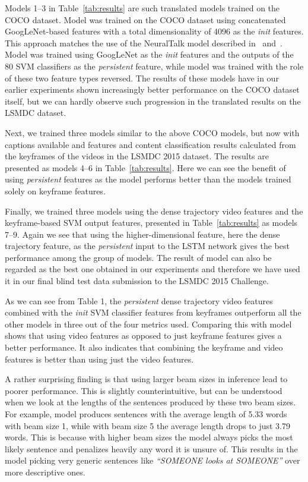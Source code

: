 Models 1--3 in Table~\ref{tab:results} are such translated models trained on the
COCO dataset.
Model  was trained on the COCO dataset using concatenated
GoogLeNet-based features with a total dimensionality of 4096 as the \emph{init}
features. 
This approach matches the use of the NeuralTalk model described
in~\cite{Vinyals_2015_CVPR} and~\cite{Karpathy_2015_CVPR}. 
Model  was trained using GoogLeNet as the \emph{init}
features and the outputs of the 80 SVM classifiers as the \emph{persistent}
feature, while model  was trained with the role of these
two feature types reversed.
The results of these models have in our earlier experiments shown increasingly
better performance on the COCO dataset itself, but we can hardly observe such
progression in the translated results on the LSMDC dataset.

Next, we trained three models similar to the above COCO models, but now with
captions available and features and content classification results calculated
from the keyframes of the videos in the LSMDC 2015 dataset.
The results are presented as models 4--6 in Table~\ref{tab:results}. 
Here we can see the benefit of using \emph{persistent} features as the model
 performs better than the models trained solely on keyframe
features.

Finally, we trained three models using the dense trajectory video features and
the keyframe-based SVM output features, presented in Table~\ref{tab:results} as
models 7--9.
Again we see that using the higher-dimensional feature, here the dense
trajectory feature, as the \emph{persistent} input to the LSTM network gives the
best performance among the group of models.
The result of model  can also be regarded as the best one
obtained in our experiments and therefore we have used it in our final blind
test data submission to the LSMDC 2015 Challenge.

As we can see from Table 1, the \emph{persistent} dense trajectory video
features combined with the \emph{init} SVM classifier features from keyframes
outperform all the other models in three out of the four metrics used.
Comparing this with model  shows that using video features as
opposed to just keyframe features gives a better performance.
It also indicates that combining the keyframe and video features is better than
using just the video features.

A rather surprising finding is that using larger beam sizes in inference lead to
poorer performance.
This is slightly counterintuitive, but can be understood when we look at the
lengths of the sentences produced by these two beam sizes. 
For example, model  produces sentences with the average length
of 5.33 words with beam size 1, while with beam size 5 the average length drops
to just 3.79 words. This is because with higher beam sizes the model always
picks the most likely sentence and penalizes heavily any word it is unsure of.
This results in the model picking very generic sentences like \emph{``SOMEONE
looks at SOMEONE''} over more descriptive ones.

